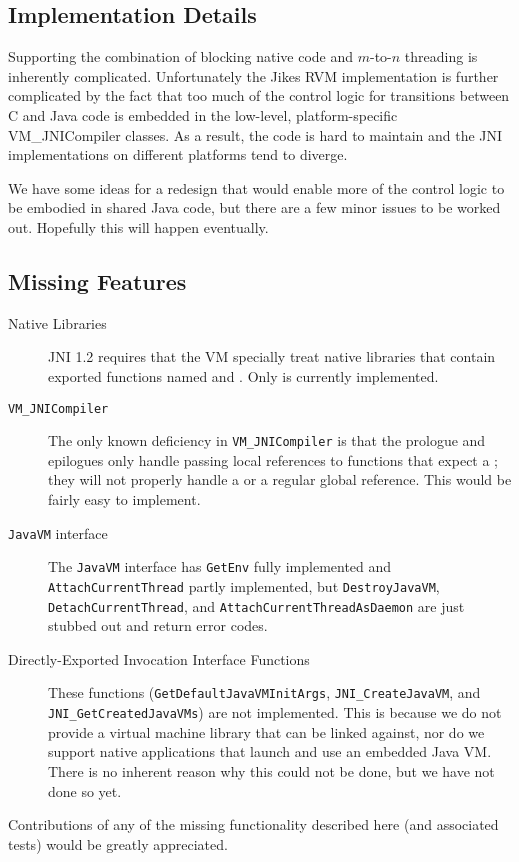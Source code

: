 \subsection{Implementation Details}
Supporting the combination of blocking native code and $m$-to-$n$
threading is inherently complicated.  Unfortunately the Jikes RVM
implementation is further complicated by the fact that too much of the
control logic for transitions between C and Java code is embedded in
the low-level, platform-specific {VM\_JNICompiler} classes.  As a
result, the code is hard to maintain and the JNI implementations
on different platforms tend to diverge. 

We have some ideas for a redesign that would enable more of the
control logic to be embodied in shared Java code, but there are a few
minor issues to be worked out.  Hopefully this will happen eventually.

\subsection{Missing Features}

\begin{description}

\item[Native Libraries]
JNI 1.2 requires that the VM specially treat native libraries that
contain exported functions named
 and .  Only
 is currently implemented. 

\item[\texttt{VM\_JNICompiler}] The only known deficiency in \texttt{VM\_JNICompiler} is that the
prologue and epilogues only handle passing local references to
functions that expect a ; they will not properly
handle a  or a regular global reference.  This would be
fairly easy to implement.

\item[\texttt{JavaVM} interface]
The \texttt{JavaVM} interface has \texttt{GetEnv} fully
implemented and \texttt{AttachCurrentThread} partly implemented, but
\texttt{DestroyJavaVM}, \texttt{DetachCurrentThread}, and
\texttt{AttachCurrentThreadAsDaemon} are just stubbed out and return
error codes.

\item[{Directly-Exported Invocation Interface Functions}] These
functions (\texttt{GetDefaultJavaVMInitArgs},
\texttt{JNI\_CreateJavaVM}, and \texttt{JNI\_GetCreatedJavaVMs}) are not
implemented.  This is because we do not provide a virtual machine
library that can be linked against, nor do we support native
applications that launch and use an embedded Java VM.  There is no
inherent reason why this could not be done, but we have not done so
yet.  

\end{description}

Contributions of any of the missing functionality described here (and
associated tests) would be greatly appreciated.

